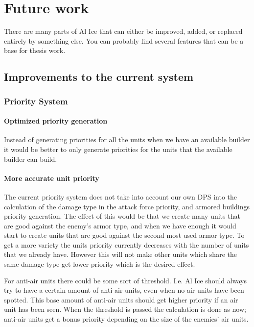 \section{Future work}
There are many parts of Al Ice that can either be improved, added, or replaced entirely by something
else. You can probably find several features that can be a base for thesis work.

\subsection{Improvements to the current system}
\subsubsection{Priority System} 
\label{sec:priority_further_improvements}
\paragraph{Optimized priority generation}
Instead of generating priorities for all the units when we have an available
builder it would be better to only generate priorities for the units that the
available builder can build.

\paragraph{More accurate unit priority}
\label{sec:priority_improvement_accurate_unit_priority}
The current priority system does not take into account our own DPS into the
calculation of the damage type in the attack force priority, and armored
buildings priority generation. The effect of this would be that we create many
units that are good against the enemy's armor type, and when we have enough it
would start to create units that are good against the second most used armor
type. To get a more variety the units priority currently decreases with the
number of units that we already have. However this will not make other units
which share the same damage type get lower priority which is the desired effect.

For anti-air units there could be some sort of threshold. I.e. Al Ice should always try to have a
certain amount of anti-air units, even when no air units have been spotted. This base amount of
anti-air units should get higher priority if an air unit has been seen. When the threshold is passed
the calculation is done as now; anti-air units get a bonus priority depending on the size of the
enemies' air units.

